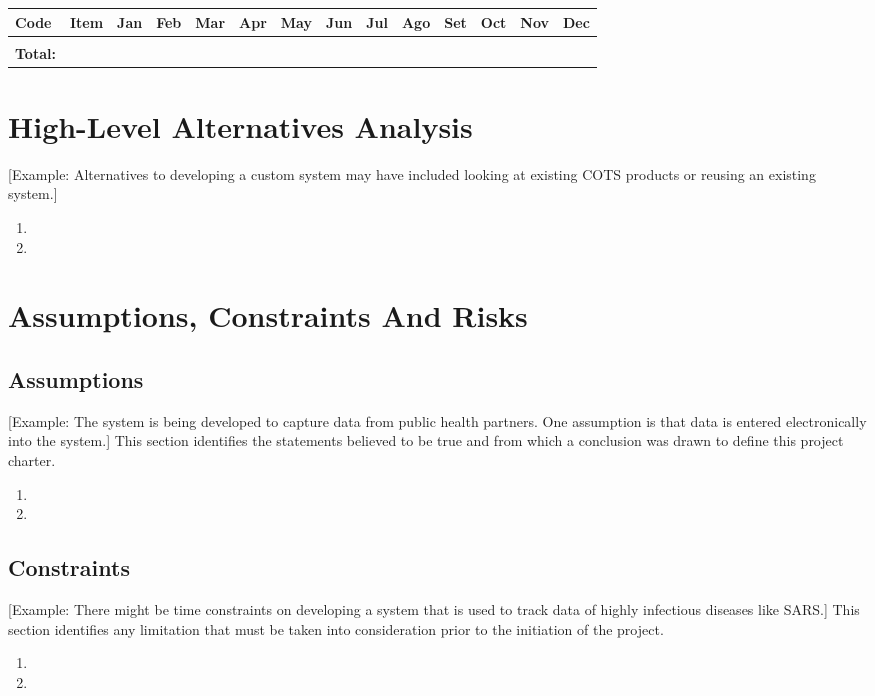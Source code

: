 \documentclass[11pt]{article}
\begin{document}
\begin{center}
\begin{tabular}{llllllllllllll}
Code & Item & Jan & Feb & Mar & Apr & May & Jun & Jul & Ago & Set & Oct & Nov & Dec\\
\hline
 &  &  &  &  &  &  &  &  &  &  &  &  & \\
\hline
\textbf{Total:} &  &  &  &  &  &  &  &  &  &  &  &  & \\
\end{tabular}
\end{center}

\section{High-Level Alternatives Analysis}
\label{sec:org64c66f7}
[Example: Alternatives to developing a custom system may have included looking at existing COTS products or reusing an existing system.]
\begin{enumerate}
\item{}
\item{}
\end{enumerate}
\section{Assumptions, Constraints And Risks}
\label{sec:org80ff5ec}
\subsection{Assumptions}
\label{sec:orgaf6df25}
[Example: The system is being developed to capture data from public health partners. One assumption is that data is entered electronically into the system.]  
This section identifies the statements believed to be true and from which a conclusion was drawn to define this project charter. 
\begin{enumerate}
\item{}
\item{}
\end{enumerate}
\subsection{Constraints}
\label{sec:orgf6dd6cd}
[Example: There might be time constraints on developing a system that is used to track data of highly infectious diseases like SARS.]
This section identifies any limitation that must be taken into consideration prior to the initiation of the project.
\begin{enumerate}
\item{}
\item{}
\end{enumerate}
\end{document}
